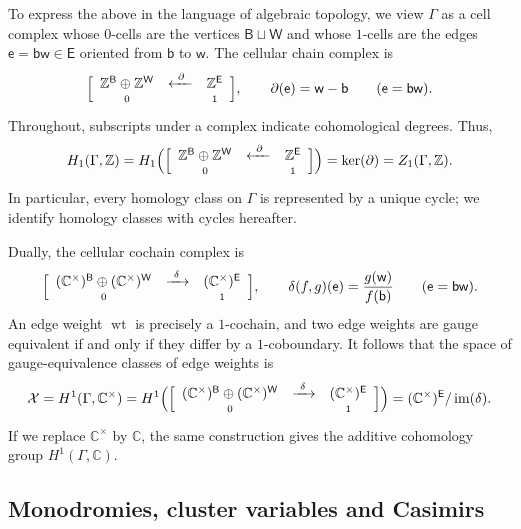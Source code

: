 \documentclass[dvipsnames,11pt]{article}
\theoremstyle{definition}
\newcommand{\wt}{\operatorname{wt}}
\newcommand{\Z}{{\mathbb Z}}
\newcommand{\C}{{\mathbb C}}
\def\B{\mathsf B}
\def\W{\mathsf W}
\def\w{\mathsf w}
\def\b{\mathsf b}
\def\e{\mathsf e}
\def\E{\mathsf E}
\def\graph{\Gamma}
\newcommand{\be}{\begin{equation}}
\newcommand{\ee}{\end{equation}}
\DeclareMathOperator{\im}{im}
\begin{document}
To express the above in the language of algebraic topology, we view \(\Gamma\) as a cell complex whose
\(0\)-cells are the vertices \(\B\sqcup \W\) and whose \(1\)-cells are the edges \(\e=\b\w \in \E\) oriented from $\b$ to $\w$. The cellular chain complex is
\[
\Bigl[
\begin{array}{c c c}
\Z^{\B}\oplus \Z^{\W} & \xleftarrow{\ \partial \ } & \Z^{\E}\\[-.4ex]
{\scriptstyle 0} && {\scriptstyle 1}
\end{array}
\Bigr], \qquad \partial(\e)=\w-\b \qquad (\e=\b\w).
\]
Throughout, subscripts under a complex indicate cohomological degrees. Thus,
\[
H_1(\Gamma,\Z)=H_1 \Bigl(\Bigl[
\begin{array}{c c c}
\Z^{\B}\oplus \Z^{\W} & \xleftarrow{\ \partial \ } & \Z^{\E}\\[-.4ex]
{\scriptstyle 0} && {\scriptstyle 1}
\end{array}
\Bigr]\Bigr) = \ker(\partial) = Z_1(\graph,\Z).
\]
In particular, every homology class on $\Gamma$ is represented by a unique cycle; we identify homology classes with cycles hereafter.

Dually, the cellular cochain complex is
\[
\Bigl[
\begin{array}{c c c}
(\C^\times)^{\B}\oplus (\C^\times)^{\W} & \xrightarrow{\ \delta \ } & (\C^\times)^{\E}\\[-.4ex]
{\scriptstyle 0} && {\scriptstyle 1}
\end{array}
\Bigr], \qquad \delta(f,g)(\e)=\frac{g(\w)}{f(\b)}
\qquad (\e=\b\w).
\]
An edge weight \(\wt\) is precisely a \(1\)-cochain, and two edge weights are gauge equivalent if and only if they differ by a \(1\)-coboundary. It follows that the space of gauge-equivalence classes of edge weights is
\be \label{eq:complex_H^1}
\mathcal X
=
H^1(\Gamma,\C^\times) = H^1 \Bigl( \Bigl[
\begin{array}{c c c}
(\C^\times)^{\B}\oplus (\C^\times)^{\W} & \xrightarrow{\ \delta \ } & (\C^\times)^{\E}\\[-.4ex]
{\scriptstyle 0} && {\scriptstyle 1}
\end{array}
\Bigr]\Bigr) = (\C^\times)^{\E}/\im(\delta).
\ee
If we replace \(\C^\times\) by \(\C\), the same construction gives the additive cohomology group \(H^1(\Gamma,\C)\).




\subsection{Monodromies, cluster variables and Casimirs}
\end{document}
